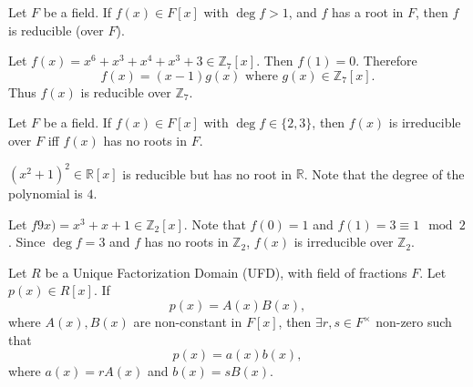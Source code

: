 \documentclass[notoc,notitlepage]{tufte-book}
\begin{document}
\begin{propo}\label{propo:polynomials_with_roots_are_reducible}
  Let $F$ be a field. If $f(x) \in F[x]$ with $\deg f > 1$, and $f$ has a root in $F$,
  then $f$ is reducible (over $F$).
\end{propo}

\begin{eg}
  Let $f(x) = x^6 + x^3 + x^4 + x^3 + 3 \in \mathbb{Z}_7[x]$. Then $f(1) = 0$.
  Therefore
  \begin{equation*}
    f(x) = (x - 1) g(x) \text{ where } g(x) \in \mathbb{Z}_7[x].
  \end{equation*}
  Thus $f(x)$ is reducible over $\mathbb{Z}_7$.
\end{eg}

\begin{propo}\label{propo:irreducible_rootless_polynomials}
  Let $F$ be a field. If $f(x) \in F[x]$ with $\deg f \in \{ 2, 3 \}$, then $f(x)$ is irreducible over $F$
  iff $f(x)$ has no roots in $F$.
\end{propo}

\begin{warning}
  $(x^2 + 1)^2 \in \mathbb{R}[x]$ is reducible but has no root in $\mathbb{R}$. Note that
  the degree of the polynomial is $4$.
\end{warning}

\begin{eg}
  Let $f9x) = x^3 + x + 1 \in \mathbb{Z}_2[x]$. Note that $f(0) = 1$ and 
  $f(1) = 3 \equiv 1 \mod 2$. Since $\deg f = 3$ and $f$ has no roots in $\mathbb{Z}_2$,
  $f(x)$ is irreducible over $\mathbb{Z}_2$.
\end{eg}

\begin{thm}\label{thm:gauss_lemma}
  Let $R$ be a Unique Factorization Domain (UFD), with field of fractions $F$.
  Let $p(x) \in R[x]$. If
  \begin{equation*}
    p(x) = A(x) B(x),
  \end{equation*}
  where $A(x), B(x)$ are non-constant in $F[x]$, then 
  $\exists r, s \in F^\times$ non-zero such that
  \begin{equation*}
    p(x) = a(x) b(x),
  \end{equation*}
  where $a(x) = rA(x)$ and $b(x) = sB(x)$.
\end{thm}
\end{document}
